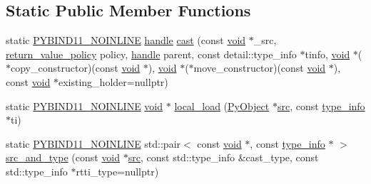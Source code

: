 \subsection*{Static Public Member Functions}
\begin{DoxyCompactItemize}
\item 
static \mbox{\hyperlink{detail_2common_8h_a1fb186b7494d5c576d902c0730ecbb71}{P\+Y\+B\+I\+N\+D11\+\_\+\+N\+O\+I\+N\+L\+I\+NE}} \mbox{\hyperlink{classhandle}{handle}} \mbox{\hyperlink{classtype__caster__generic_a7256e99988999dc3735dadaf55757b4a}{cast}} (const \mbox{\hyperlink{_s_d_l__opengles2__gl2ext_8h_ae5d8fa23ad07c48bb609509eae494c95}{void}} $\ast$\+\_\+src, \mbox{\hyperlink{detail_2common_8h_adde72ab1fb0dd4b48a5232c349a53841}{return\+\_\+value\+\_\+policy}} policy, \mbox{\hyperlink{classhandle}{handle}} parent, const detail\+::type\+\_\+info $\ast$tinfo, \mbox{\hyperlink{_s_d_l__opengles2__gl2ext_8h_ae5d8fa23ad07c48bb609509eae494c95}{void}} $\ast$($\ast$copy\+\_\+constructor)(const \mbox{\hyperlink{_s_d_l__opengles2__gl2ext_8h_ae5d8fa23ad07c48bb609509eae494c95}{void}} $\ast$), \mbox{\hyperlink{_s_d_l__opengles2__gl2ext_8h_ae5d8fa23ad07c48bb609509eae494c95}{void}} $\ast$($\ast$move\+\_\+constructor)(const \mbox{\hyperlink{_s_d_l__opengles2__gl2ext_8h_ae5d8fa23ad07c48bb609509eae494c95}{void}} $\ast$), const \mbox{\hyperlink{_s_d_l__opengles2__gl2ext_8h_ae5d8fa23ad07c48bb609509eae494c95}{void}} $\ast$existing\+\_\+holder=nullptr)
\item 
static \mbox{\hyperlink{detail_2common_8h_a1fb186b7494d5c576d902c0730ecbb71}{P\+Y\+B\+I\+N\+D11\+\_\+\+N\+O\+I\+N\+L\+I\+NE}} \mbox{\hyperlink{_s_d_l__opengles2__gl2ext_8h_ae5d8fa23ad07c48bb609509eae494c95}{void}} $\ast$ \mbox{\hyperlink{classtype__caster__generic_a15be63015f7dc58ae09d57d9aaa71840}{local\+\_\+load}} (\mbox{\hyperlink{_python27_2object_8h_aadc84ac7aed2cfa6f20c25f62bf3dac7}{Py\+Object}} $\ast$\mbox{\hyperlink{_s_d_l__opengl__glext_8h_a72e0fdf0f845ded60b1fada9e9195cd7}{src}}, const \mbox{\hyperlink{structtype__info}{type\+\_\+info}} $\ast$ti)
\item 
static \mbox{\hyperlink{detail_2common_8h_a1fb186b7494d5c576d902c0730ecbb71}{P\+Y\+B\+I\+N\+D11\+\_\+\+N\+O\+I\+N\+L\+I\+NE}} std\+::pair$<$ const \mbox{\hyperlink{_s_d_l__opengles2__gl2ext_8h_ae5d8fa23ad07c48bb609509eae494c95}{void}} $\ast$, const \mbox{\hyperlink{structtype__info}{type\+\_\+info}} $\ast$ $>$ \mbox{\hyperlink{classtype__caster__generic_a2f47b7a5edcbc5d26abfb7807baf5139}{src\+\_\+and\+\_\+type}} (const \mbox{\hyperlink{_s_d_l__opengles2__gl2ext_8h_ae5d8fa23ad07c48bb609509eae494c95}{void}} $\ast$\mbox{\hyperlink{_s_d_l__opengl__glext_8h_a72e0fdf0f845ded60b1fada9e9195cd7}{src}}, const std\+::type\+\_\+info \&cast\+\_\+type, const std\+::type\+\_\+info $\ast$rtti\+\_\+type=nullptr)
\end{DoxyCompactItemize}
